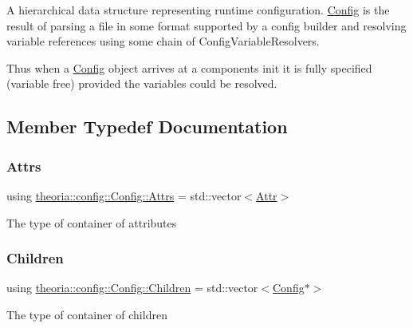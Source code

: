 A hierarchical data structure representing runtime configuration. \hyperlink{classtheoria_1_1config_1_1Config}{Config} is the result of parsing a file in some format supported by a config builder and resolving variable references using some chain of Config\+Variable\+Resolvers.

Thus when a \hyperlink{classtheoria_1_1config_1_1Config}{Config} object arrives at a component\textquotesingle{}s init it is fully specified (variable free) provided the variables could be resolved. 

\subsection{Member Typedef Documentation}
\mbox{\label{classtheoria_1_1config_1_1Config_a3590578a57d530fe1e51d25b0e492f7d}} 
\subsubsection{\texorpdfstring{Attrs}{Attrs}}
{\footnotesize\ttfamily using \hyperlink{classtheoria_1_1config_1_1Config_a3590578a57d530fe1e51d25b0e492f7d}{theoria\+::config\+::\+Config\+::\+Attrs} =  std\+::vector$<$\hyperlink{structtheoria_1_1config_1_1Config_1_1Attr}{Attr}$>$\hspace{0.3cm}{\ttfamily [protected]}}

The type of container of attributes \mbox{\label{classtheoria_1_1config_1_1Config_acc6cccfd7dd23be9bbd053c55a1e8eb7}} 
\subsubsection{\texorpdfstring{Children}{Children}}
{\footnotesize\ttfamily using \hyperlink{classtheoria_1_1config_1_1Config_acc6cccfd7dd23be9bbd053c55a1e8eb7}{theoria\+::config\+::\+Config\+::\+Children} =  std\+::vector$<$\hyperlink{classtheoria_1_1config_1_1Config}{Config}$\ast$$>$\hspace{0.3cm}{\ttfamily [protected]}}

The type of container of children \mbox{\label{classtheoria_1_1config_1_1Config_a293ebfd7146d935e232a066f7e6fa279}} 
